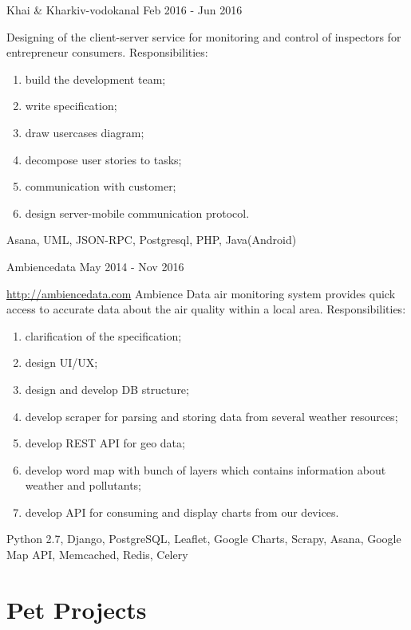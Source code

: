 \documentclass[11pt,a4paper]{moderncv}
\begin{document}
	\cvline
	{Khai \& Kharkiv-vodokanal  Feb 2016 - Jun 2016}
    {Designing of the client-server service for monitoring and control of inspectors for entrepreneur consumers.\newline{}
    Responsibilities:
        \begin{enumerate}
            \item build the development team;
            \item write specification;
            \item draw usercases diagram;
            \item decompose user stories to tasks;
            \item communication with customer;
            \item design server-mobile communication protocol.
        \end{enumerate}
    \newline{}\newline{}
    Asana, UML, JSON-RPC, Postgresql, PHP, Java(Android)}

	\cvline
	{Ambiencedata May 2014 - Nov 2016}
	{\url{http://ambiencedata.com}\newline{}
		Ambience Data air monitoring system provides quick access to accurate data about the air quality within a local area.\newline{}
		Responsibilities: 
		    \begin{enumerate}
		        \item clarification of the specification;
		        \item design UI/UX;
		        \item design and develop DB structure;
		        \item develop scraper for parsing and storing data from several weather resources;
		        \item develop REST API for geo data;
		        \item develop word map with bunch of layers which contains information about weather and pollutants;
		        \item develop API for consuming and display charts from our devices.
		    \end{enumerate}
		\newline{}\newline{}
		Python 2.7, Django, PostgreSQL, Leaflet, Google Charts, Scrapy, Asana, Google Map API, Memcached, Redis, Celery}


	\section{Pet Projects}
\end{document}
